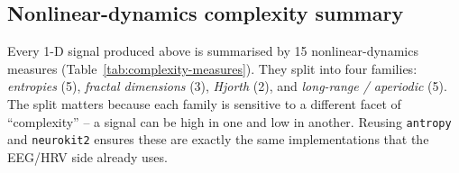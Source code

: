 \documentclass[11pt,a4paper]{article}
\newcommand{\code}[1]{\texttt{\small #1}}
\begin{document}
\subsection{Nonlinear-dynamics complexity summary}\label{sec:complexity}

Every 1-D signal produced above is summarised by 15 nonlinear-dynamics
measures (Table~\ref{tab:complexity-measures}). They split into four
families: \emph{entropies} (5), \emph{fractal dimensions} (3),
\emph{Hjorth} (2), and \emph{long-range / aperiodic} (5). The split
matters because each family is sensitive to a different facet of
``complexity'' -- a signal can be high in one and low in another. Reusing
\code{antropy} \citep{antropy} and \code{neurokit2} \citep{neurokit2}
ensures these are exactly the same implementations that the EEG/HRV
side already uses.
\end{document}
